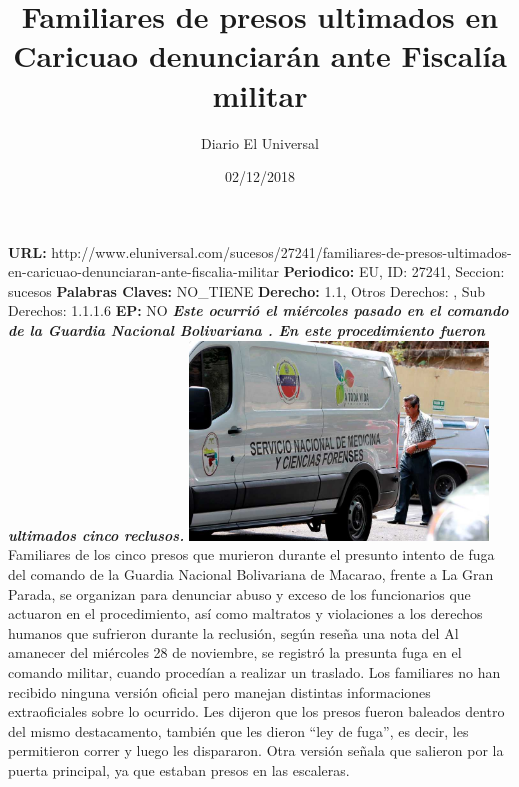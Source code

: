 \documentclass{article}%
\title{\textbf{Familiares de presos ultimados en Caricuao denunciarán ante Fiscalía militar}}%
\author{Diario El Universal}%
\date{02/12/2018}%
\begin{document}
%
\normalsize%
\maketitle%
\textbf{URL: }%
http://www.eluniversal.com/sucesos/27241/familiares{-}de{-}presos{-}ultimados{-}en{-}caricuao{-}denunciaran{-}ante{-}fiscalia{-}militar\newline%
%
\textbf{Periodico: }%
EU, %
ID: %
27241, %
Seccion: %
sucesos\newline%
%
\textbf{Palabras Claves: }%
NO\_TIENE\newline%
%
\textbf{Derecho: }%
1.1, %
Otros Derechos: %
, %
Sub Derechos: %
1.1.1.6\newline%
%
\textbf{EP: }%
NO\newline%
\newline%
%
\textbf{\textit{Este ocurrió el miércoles pasado en el comando de la Guardia Nacional Bolivariana . En este procedimiento fueron ultimados cinco reclusos.}}%
\newline%
\newline%
%
\includegraphics[width=300px]{86.jpg}%
\newline%
%
Familiares de los cinco presos que murieron durante el presunto intento de fuga del comando de la Guardia Nacional Bolivariana de Macarao, frente a La Gran Parada, se organizan para denunciar abuso y exceso de los funcionarios que actuaron en el procedimiento, así como maltratos y violaciones a los derechos humanos que sufrieron durante la reclusión, según reseña una nota del%
\newline%
%
Al amanecer del miércoles 28 de noviembre, se registró la presunta fuga en el comando militar, cuando procedían a realizar un traslado. Los familiares no han recibido ninguna versión oficial pero manejan distintas informaciones extraoficiales sobre lo ocurrido. Les dijeron que los presos fueron baleados dentro del mismo destacamento, también que les dieron “ley de fuga”, es decir, les permitieron correr y luego les dispararon. Otra versión señala que salieron por la puerta principal, ya que estaban presos en las escaleras.%
\end{document}
